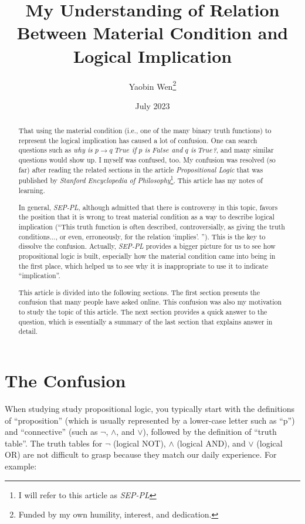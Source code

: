 \documentclass[12pt, letterpaper]{article}
\title{
  My Understanding of Relation Between Material Condition and Logical
  Implication
}
\author{
  Yaobin Wen\thanks{Funded by my own humility, interest, and dedication.}
}
\date{July 2023}
\begin{document}
\maketitle

\begin{abstract}
  That using the material condition (i.e., one of the many binary truth
  functions) to represent the logical implication has caused a lot of confusion.
  One can search questions such as \textit{why is $p \rightarrow q$ $True$ if
  $p$ is $False$ and $q$ is $True$?}, and many similar questions would show up.
  I myself was confused, too. My confusion was resolved (so far) after reading
  the related sections in the article \textit{Propositional Logic} that was
  published by \textit{Stanford Encyclopedia of Philosophy}\footnote{I will
  refer to this article as \textit{SEP-PL}}. This article has my notes of
  learning.

  In general, \textit{SEP-PL}, although admitted that there is controversy in
  this topic, favors the position that it is wrong to treat material condition
  as a way to describe logical implication (``This truth function is often
  described, controversially, as giving the truth conditions..., or even,
  erroneously, for the relation `implies'. ''). This is the key to dissolve the
  confusion. Actually, \textit{SEP-PL} provides a bigger picture for us to see
  how propositional logic is built, especially how the material condition came
  into being in the first place, which helped us to see why it is inappropriate
  to use it to indicate ``implication''.

  This article is divided into the following sections. The first section
  presents the confusion that many people have asked online. This confusion was
  also my motivation to study the topic of this article. The next section
  provides a quick answer to the question, which is essentially a summary of
  the last section that explains answer in detail.
\end{abstract}

\section{The Confusion}

When studying study propositional logic, you typically start with the
definitions of ``proposition'' (which is usually represented by a lower-case
letter such as ``p'') and ``connective'' (such as $\lnot$, $\land$, and $\lor$),
followed by the definition of ``truth table''. The truth tables for $\lnot$
(logical NOT), $\land$ (logical AND), and $\lor$ (logical OR) are not difficult
to grasp because they match our daily experience. For example:
\end{document}
